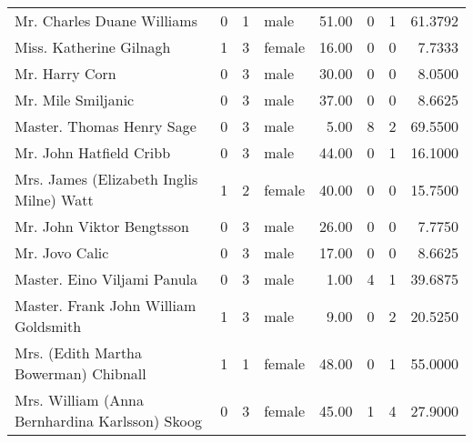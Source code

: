 \begin{tabular}{lrrlrrrr}
Mr. Charles Duane Williams                         &         0 &       1 &    male &  51.00 &                        0 &                        1 &   61.3792 \\
Miss. Katherine Gilnagh                            &         1 &       3 &  female &  16.00 &                        0 &                        0 &    7.7333 \\
Mr. Harry Corn                                     &         0 &       3 &    male &  30.00 &                        0 &                        0 &    8.0500 \\
Mr. Mile Smiljanic                                 &         0 &       3 &    male &  37.00 &                        0 &                        0 &    8.6625 \\
Master. Thomas Henry Sage                          &         0 &       3 &    male &   5.00 &                        8 &                        2 &   69.5500 \\
Mr. John Hatfield Cribb                            &         0 &       3 &    male &  44.00 &                        0 &                        1 &   16.1000 \\
Mrs. James (Elizabeth Inglis Milne) Watt           &         1 &       2 &  female &  40.00 &                        0 &                        0 &   15.7500 \\
Mr. John Viktor Bengtsson                          &         0 &       3 &    male &  26.00 &                        0 &                        0 &    7.7750 \\
Mr. Jovo Calic                                     &         0 &       3 &    male &  17.00 &                        0 &                        0 &    8.6625 \\
Master. Eino Viljami Panula                        &         0 &       3 &    male &   1.00 &                        4 &                        1 &   39.6875 \\
Master. Frank John William Goldsmith               &         1 &       3 &    male &   9.00 &                        0 &                        2 &   20.5250 \\
Mrs. (Edith Martha Bowerman) Chibnall              &         1 &       1 &  female &  48.00 &                        0 &                        1 &   55.0000 \\
Mrs. William (Anna Bernhardina Karlsson) Skoog     &         0 &       3 &  female &  45.00 &                        1 &                        4 &   27.9000 \\

\end{tabular}
